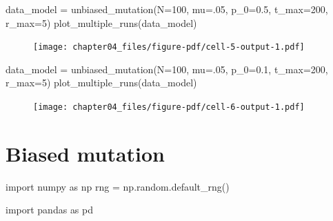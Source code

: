 \documentclass[
  a4paperpaper,
  ,captions=tableheading
]{scrbook}
\newenvironment{Shaded}{\begin{snugshade}}{\end{snugshade}}
\newcommand{\DecValTok}[1]{\textcolor[rgb]{0.68,0.00,0.00}{#1}}
\newcommand{\FloatTok}[1]{\textcolor[rgb]{0.68,0.00,0.00}{#1}}
\newcommand{\ImportTok}[1]{\textcolor[rgb]{0.00,0.46,0.62}{#1}}
\newcommand{\NormalTok}[1]{\textcolor[rgb]{0.00,0.23,0.31}{#1}}
\newcommand{\OperatorTok}[1]{\textcolor[rgb]{0.37,0.37,0.37}{#1}}
\begin{document}
\begin{Shaded}
\begin{Highlighting}[]
\NormalTok{data\_model }\OperatorTok{=}\NormalTok{ unbiased\_mutation(N}\OperatorTok{=}\DecValTok{100}\NormalTok{, mu}\OperatorTok{=}\FloatTok{.05}\NormalTok{, p\_0}\OperatorTok{=}\FloatTok{0.5}\NormalTok{, t\_max}\OperatorTok{=}\DecValTok{200}\NormalTok{, r\_max}\OperatorTok{=}\DecValTok{5}\NormalTok{)}
\NormalTok{plot\_multiple\_runs(data\_model)}
\end{Highlighting}
\end{Shaded}

\begin{figure}[H]

{\centering \texttt{[image: chapter04\_files/figure-pdf/cell-5-output-1.pdf]}

}

\end{figure}

\begin{Shaded}
\begin{Highlighting}[]
\NormalTok{data\_model }\OperatorTok{=}\NormalTok{ unbiased\_mutation(N}\OperatorTok{=}\DecValTok{100}\NormalTok{, mu}\OperatorTok{=}\FloatTok{.05}\NormalTok{, p\_0}\OperatorTok{=}\FloatTok{0.1}\NormalTok{, t\_max}\OperatorTok{=}\DecValTok{200}\NormalTok{, r\_max}\OperatorTok{=}\DecValTok{5}\NormalTok{)}
\NormalTok{plot\_multiple\_runs(data\_model)}
\end{Highlighting}
\end{Shaded}

\begin{figure}[H]

{\centering \texttt{[image: chapter04\_files/figure-pdf/cell-6-output-1.pdf]}

}

\end{figure}

\hypertarget{biased-mutation}{%
\chapter{Biased mutation}\label{biased-mutation}}

\begin{Shaded}
\begin{Highlighting}[]
\ImportTok{import}\NormalTok{ numpy }\ImportTok{as}\NormalTok{ np}
\NormalTok{rng }\OperatorTok{=}\NormalTok{ np.random.default\_rng()}

\ImportTok{import}\NormalTok{ pandas }\ImportTok{as}\NormalTok{ pd}
\end{Highlighting}
\end{Shaded}
\end{document}
